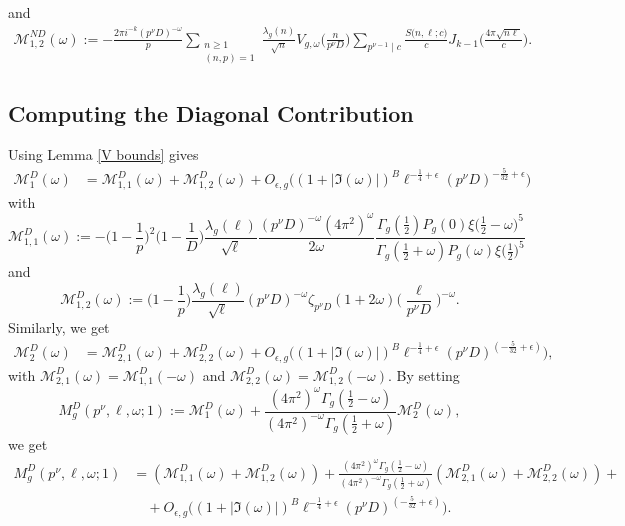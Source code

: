 \documentclass[12pt]{amsart}
\theoremstyle{plain}
\theoremstyle{definition}
\begin{document}
and 
    \begin{align*}
     \mathcal{M}_{1,2}^{ND}(\omega)
    := -\frac{2\pi i^{-k} (p^\nu D)^{-\omega}}{p}   
     \sum_{\substack{n\geq 1\\ (n,p)=1}}
    \frac{\lambda_g(n)}{\sqrt n} 
    V_{g, \omega}\Big(\frac{n}{p^\nu D}\Big)
    \sum_{p^{\nu-1} \mid c} 
    \frac{S\big(n, \ell; c\big)}{c}
    J_{k-1}\Big(\frac{4\pi\sqrt{n\ell}}{c}\Big).
    \end{align*}
\subsection{Computing the Diagonal Contribution} Using Lemma \ref{V bounds} gives  
  \begin{align*}
    \mathcal{M}_1^D(\omega)
       &= \mathcal{M}_{1, 1}^D(\omega) + \mathcal{M}_{1, 2}^D(\omega)
    + O_{\epsilon, g}\Big((1+|\Im(\omega)|)^B \ell^{-\frac14+\epsilon} (p^\nu D)^{-\frac{5}{32}+\epsilon}\Big)
     \end{align*}
     with 
     \begin{equation*}
     \mathcal{M}_{1, 1}^D(\omega) :=- \Big(1-\frac{1}{p}\Big)^2  \Big(1-\frac1{D}\Big)  \frac{ \lambda_g(\ell)}{\sqrt\ell} 
        \frac{(p^\nu D)^{-\omega} (4\pi^2)^{\omega}} {2\omega} \frac{\Gamma_g\left(\frac12\right)P_g(0) \xi\big(\frac12-\omega\big)^5}{\Gamma_g\left(\frac12+\omega\right)P_g(\omega)
    \xi\big(\frac12\big)^5}
     \end{equation*}
     and 
     \begin{equation*}
     \mathcal{M}_{1, 2}^D(\omega) := \Big(1-\frac{1}{p}\Big) \frac{ \lambda_g(\ell)}{\sqrt\ell} (p^\nu D)^{-\omega} 
     \zeta_{p^\nu D} (1+2\omega)
    \Big(\frac{\ell}{p^\nu D}\Big)^{-\omega}.
     \end{equation*}
 Similarly, we get
     \begin{align*}
    \mathcal{M}_2^D(\omega)
     &= \mathcal{M}_{2, 1}^D(\omega) + \mathcal{M}_{2, 2}^D(\omega)
    + O_{\epsilon, g}\Big((1+|\Im(\omega)|)^B \ell^{-\frac14+\epsilon} (p^\nu D)^{\left(-\frac{5}{32}+\epsilon\right)}\Big),
     \end{align*}
     with $ \mathcal{M}_{2, 1}^D(\omega)= \mathcal{M}_{1, 1}^D(-\omega)$ and $ \mathcal{M}_{2, 2}^D(\omega) =   \mathcal{M}_{1, 2}^D(-\omega)$.
 By setting
     \[
    M_g^D(p^{\nu},\ell, \omega;1)
     := \mathcal{M}_1^D(\omega) + \frac{(4\pi^2)^{\omega} \Gamma_g(\frac12-\omega)}{(4\pi^2)^{-\omega} \Gamma_g(\frac12+\omega)}  \mathcal{M}_2^D(\omega),
     \]
we get
\begin{align*}
M_g^D(p^{\nu},\ell, \omega;1)&=  \left( \mathcal{M}_{1, 1}^D(\omega) + \mathcal{M}_{1, 2}^D(\omega)\right)+ \frac{(4\pi^2)^{\omega} \Gamma_g(\frac12-\omega)}{(4\pi^2)^{-\omega} \Gamma_g(\frac12+\omega)} \left(\mathcal{M}_{2, 1}^D(\omega) 
+ \mathcal{M}_{2, 2}^D(\omega)\right)
+\\&\quad+ O_{\epsilon, g}\Big((1+|\Im(\omega)|)^B \ell^{-\frac14+\epsilon} (p^\nu D)^{\left(-\frac{5}{32}+\epsilon\right)}\Big).
\end{align*}
\end{document}
